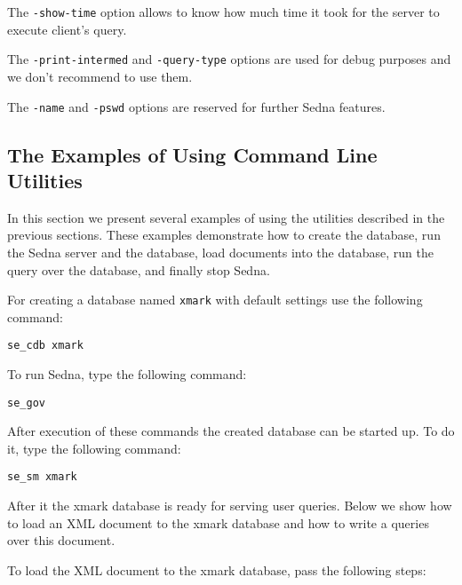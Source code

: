 \documentclass[a4paper,12pt]{article}
\begin{document}
The \verb!-show-time! option allows to know how much time it took for the server to execute client's query.

The \verb!-print-intermed! and \verb!-query-type! options are used for debug purposes and we don't recommend to use them.

The \verb!-name! and \verb!-pswd! options are reserved for further Sedna features.



\subsection{The Examples of Using Command Line Utilities}

In this section we present several examples of using the utilities described in the previous sections. These examples demonstrate how to create the database, run the Sedna server and the database, load documents into the database, run the query over the database, and finally stop Sedna.

For creating a database named \verb!xmark! with default settings use the following command:

\begin{verbatim}
se_cdb xmark
\end{verbatim}

To run Sedna, type the following command:

\begin{verbatim}
se_gov
\end{verbatim}

After execution of these commands the created database can be started up. To do it, type the following command:

\begin{verbatim}
se_sm xmark
\end{verbatim}

After it the xmark database is ready for serving user queries. Below we show how to load an XML document to the xmark database and how to write a queries over this document.

To load the XML document to the xmark database, pass the following steps:
\end{document}
